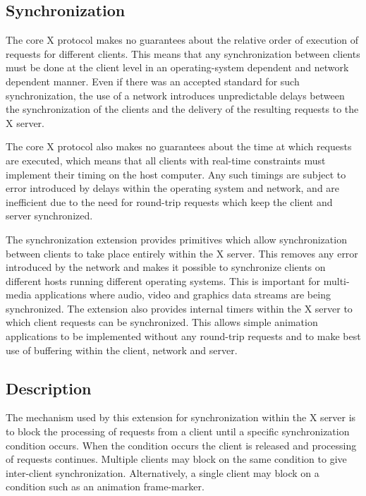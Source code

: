 \subsection*{Synchronization}

The core X protocol makes no guarantees about the relative order of execution
of requests for different clients. This means that any synchronization between
clients must be done at the client level in an operating-system dependent and
network dependent manner. Even if there was an accepted standard for such
synchronization, the use of a network introduces unpredictable delays between
the synchronization of the clients and the delivery of the resulting requests
to the X server.

The core X protocol also makes no guarantees about the time at which requests
are executed, which means that all clients with real-time constraints must
implement their timing on the host computer. Any such timings are subject to
error introduced by delays within the operating system and network, and are
inefficient due to the need for round-trip requests which keep the client and
server synchronized.

The synchronization extension provides primitives which allow synchronization
between clients to take place entirely within the X server. This removes any
error introduced by the network and makes it possible to synchronize clients
on different hosts running different operating systems. This is important for
multi-media applications where audio, video and graphics data streams are
being synchronized. The extension also provides internal timers within the X
server to which client requests can be synchronized. This allows simple
animation applications to be implemented without any round-trip requests and
to make best use of buffering within the client, network and server.

\subsection*{Description}

The mechanism used by this extension for synchronization within the X server
is to block the processing of requests from a client until a specific
synchronization condition occurs. When the condition occurs the client is
released and processing of requests continues. Multiple clients may block on
the same condition to give inter-client synchronization.  Alternatively, a
single client may block on a condition such as an animation frame-marker.

